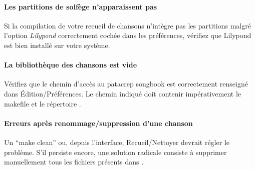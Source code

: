\paragraph{Les partitions de solfège n'apparaissent pas}
Si la compilation de votre recueil de chansons n'intègre pas les
partitions malgré l'option \emph{Lilypond} correctement cochée dans les
préférences, vérifiez que Lilypond est bien installé sur votre système. 

\paragraph{La bibliothèque des chansons est vide} 
Vérifiez que le chemin d'accès au patacrep songbook est correctement
renseigné dans Édition/Préférences.  Le chemin indiqué doit contenir
impérativement le makefile et le répertoire .

\paragraph{Erreurs après renommage/suppression d'une chanson} 
Un ``make clean'' ou, depuis l'interface, Recueil/Nettoyer devrait
régler le problème. S'il persiste encore, une solution radicale
consiste à supprimer manuellement tous les fichiers  présents
dans .

